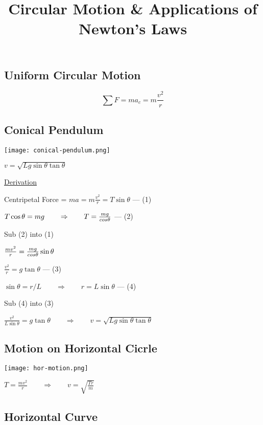 \documentclass[12pt]{article}
\title{\textbf{Circular Motion \& Applications of Newton's Laws}}
\date{}
\begin{document}
\maketitle

\begin{spacing}{1.5}

\section{Uniform Circular Motion}

$$\sum F = ma_c = m \frac{v^2}{r}$$

\subsection{Conical Pendulum}

\texttt{[image: conical-pendulum.png]}

$v = \sqrt{Lg \sin{\theta} \tan{\theta}}$

\underline{Derivation}

Centripetal Force = $ma = m \frac{v^2}{r} = T \sin{\theta}$ --- (1)

$T \cos{\theta} = mg \qquad \Rightarrow \qquad T = \frac{mg}{\\cos{\theta}}$ --- (2)

Sub (2) into (1)

$\frac{mv^2}{r} = \frac{mg}{\\cos{\theta}} \sin{\theta}$

$\frac{v^2}{r} = g \tan{\theta}$ --- (3) 

$\sin{\theta} = r/L \qquad \Rightarrow \qquad r = L \sin{\theta}$ --- (4)

Sub (4) into (3)

$\frac{v^2}{L \sin{\theta}} = g \tan{\theta} \qquad \Rightarrow \qquad v = \sqrt{Lg \sin{\theta} \tan{\theta}}$

\subsection{Motion on Horizontal Cicrle}

\texttt{[image: hor-motion.png]}

$T = \frac{mv^2}{r} \qquad \Rightarrow \qquad v = \sqrt{\frac{Tr}{m}}$

\subsection{Horizontal Curve}


\end{spacing}
\end{document}
